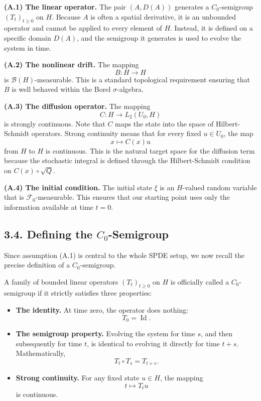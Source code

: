\documentclass[11pt]{article}
\theoremstyle{definition}
\theoremstyle{remark}
\begin{document}
\textbf{(A.1) The linear operator.} The pair \((A,D(A))\) generates a \(C_0\)-semigroup \((T_t)_{t\ge 0}\) on \(H\). Because \(A\) is often a spatial derivative, it is an unbounded operator and cannot be applied to every element of \(H\). Instead, it is defined on a specific domain \(D(A)\), and the semigroup it generates is used to evolve the system in time.

\textbf{(A.2) The nonlinear drift.} The mapping
\[
B:H\to H
\]
is \(\mathcal B(H)\)-measurable. This is a standard topological requirement ensuring that \(B\) is well behaved within the Borel \(\sigma\)-algebra.

\textbf{(A.3) The diffusion operator.} The mapping
\[
C:H\to L_2(U_0,H)
\]
is strongly continuous. Note that \(C\) maps the state into the space of Hilbert-Schmidt operators. Strong continuity means that for every fixed \(u\in U_0\), the map
\[
x\mapsto C(x)u
\]
from \(H\) to \(H\) is continuous.
This is the natural target space for the diffusion term because the stochastic integral is defined through the Hilbert-Schmidt condition on \(C(x)\circ \sqrt Q\).

\textbf{(A.4) The initial condition.} The initial state \(\xi\) is an \(H\)-valued random variable that is \(\mathcal F_0\)-measurable. This ensures that our starting point uses only the information available at time \(t=0\).

\subsection*{3.4. Defining the \(C_0\)-Semigroup}
Since assumption \textnormal{(A.1)} is central to the whole SPDE setup, we now recall the precise definition of a \(C_0\)-semigroup.

A family of bounded linear operators \((T_t)_{t\ge 0}\) on \(H\) is officially called a \(C_0\)-semigroup if it strictly satisfies three properties:
\begin{itemize}
\item \textbf{The identity.} At time zero, the operator does nothing:
\[
T_0=\operatorname{Id}.
\]
\item \textbf{The semigroup property.} Evolving the system for time \(s\), and then subsequently for time \(t\), is identical to evolving it directly for time \(t+s\). Mathematically,
\[
T_t\circ T_s=T_{t+s}.
\]
\item \textbf{Strong continuity.} For any fixed state \(u\in H\), the mapping
\[
t\mapsto T_tu
\]
is continuous.
\end{itemize}
\end{document}
